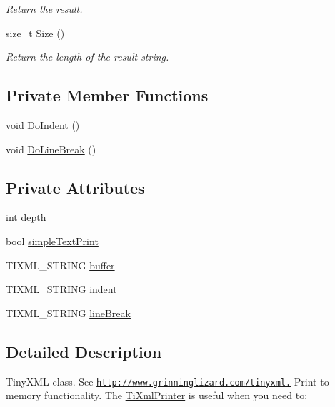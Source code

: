 \begin{DoxyCompactItemize}
\begin{DoxyCompactList}\small\item\em Return the result. \item\end{DoxyCompactList}\item 
size\_\-t \hyperlink{class_ti_xml_printer_ad01375ae9199bd2f48252eaddce3039d}{Size} ()
\begin{DoxyCompactList}\small\item\em Return the length of the result string. \item\end{DoxyCompactList}\end{DoxyCompactItemize}
\subsection*{Private Member Functions}
\begin{DoxyCompactItemize}
\item 
void \hyperlink{class_ti_xml_printer_a348ad6527b1d43ddeb51454cddeb6a1d}{DoIndent} ()
\item 
void \hyperlink{class_ti_xml_printer_a252a0e13e06def9a06b2eb30a04677a0}{DoLineBreak} ()
\end{DoxyCompactItemize}
\subsection*{Private Attributes}
\begin{DoxyCompactItemize}
\item 
int \hyperlink{class_ti_xml_printer_a7e11330449daea912320c22f84387df7}{depth}
\item 
bool \hyperlink{class_ti_xml_printer_a2dceede5ae9bb8948f1ecaabb24ab2fb}{simpleTextPrint}
\item 
TIXML\_\-STRING \hyperlink{class_ti_xml_printer_ae6cc56c79e52ef352ecc612809fdbedf}{buffer}
\item 
TIXML\_\-STRING \hyperlink{class_ti_xml_printer_a672fda389bb3f5a2ae8ead867f9a2536}{indent}
\item 
TIXML\_\-STRING \hyperlink{class_ti_xml_printer_a25e8120bcfda10cc06a11b2dedcef7fe}{lineBreak}
\end{DoxyCompactItemize}


\subsection{Detailed Description}
TinyXML class. See \href{http://www.grinninglizard.com/tinyxml.}{\tt http://www.grinninglizard.com/tinyxml.} Print to memory functionality. The \hyperlink{class_ti_xml_printer}{TiXmlPrinter} is useful when you need to:


